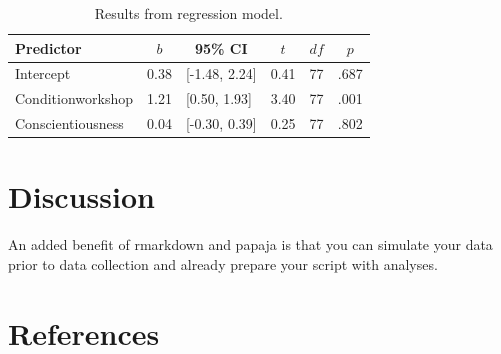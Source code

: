 \documentclass[
  man]{apa6}
\begin{document}
\begin{table}[tbp]

\begin{center}
\begin{threeparttable}

\caption{\label{tab:regression-table}Results from regression model.}

\begin{tabular}{llllll}
\toprule
Predictor & \multicolumn{1}{c}{$b$} & \multicolumn{1}{c}{95\% CI} & \multicolumn{1}{c}{$t$} & \multicolumn{1}{c}{$\mathit{df}$} & \multicolumn{1}{c}{$p$}\\
\midrule
Intercept & 0.38 & {}[-1.48, 2.24] & 0.41 & 77 & .687\\
Conditionworkshop & 1.21 & {}[0.50, 1.93] & 3.40 & 77 & .001\\
Conscientiousness & 0.04 & {}[-0.30, 0.39] & 0.25 & 77 & .802\\
\bottomrule
\end{tabular}

\end{threeparttable}
\end{center}

\end{table}

\hypertarget{discussion}{%
\section{Discussion}\label{discussion}}

An added benefit of rmarkdown and papaja is that you can simulate your data prior to data collection and already prepare your script with analyses.

\newpage

\hypertarget{references}{%
\section{References}\label{references}}

\begingroup
\setlength{\parindent}{-0.5in}
\setlength{\leftskip}{0.5in}
\end{document}
